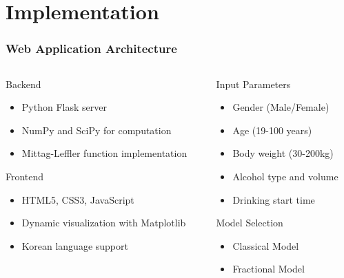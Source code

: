 \documentclass{beamer}
\begin{document}
\section{Implementation}

\begin{frame}
\frametitle{Web Application Architecture}
\begin{columns}
\begin{column}{0.5\textwidth}
\begin{block}{Backend}
\begin{itemize}
    \item Python Flask server
    \item NumPy and SciPy for computation
    \item Mittag-Leffler function implementation
\end{itemize}
\end{block}

\begin{block}{Frontend}
\begin{itemize}
    \item HTML5, CSS3, JavaScript
    \item Dynamic visualization with Matplotlib
    \item Korean language support
\end{itemize}
\end{block}
\end{column}

\begin{column}{0.5\textwidth}
\begin{block}{Input Parameters}
\begin{itemize}
    \item Gender (Male/Female)
    \item Age (19-100 years)
    \item Body weight (30-200kg)
    \item Alcohol type and volume
    \item Drinking start time
\end{itemize}
\end{block}

\begin{block}{Model Selection}
\begin{itemize}
    \item Classical Model
    \item Fractional Model
\end{itemize}
\end{block}
\end{column}
\end{columns}
\end{frame}
\end{document}

